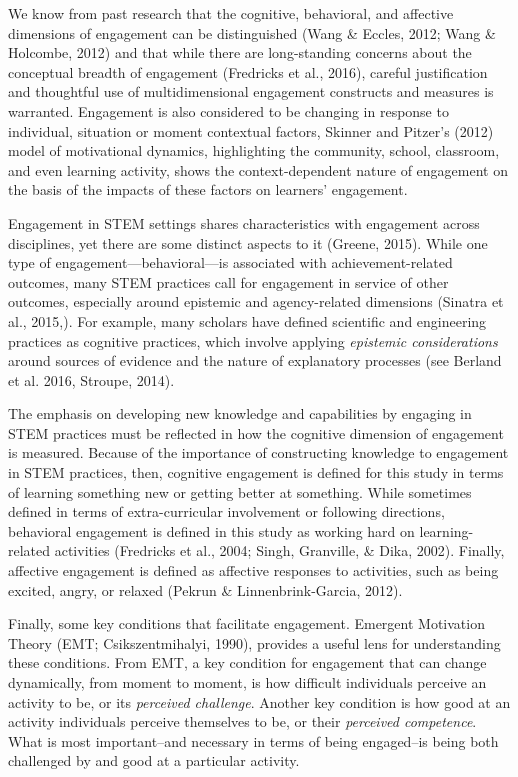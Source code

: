 \documentclass[]{msu-thesis}
\theoremstyle{definition}
\theoremstyle{definition}
\theoremstyle{definition}
\theoremstyle{remark}
\begin{document}
We know from past research that the cognitive, behavioral, and affective
dimensions of engagement can be distinguished (Wang \& Eccles, 2012;
Wang \& Holcombe, 2012) and that while there are long-standing concerns
about the conceptual breadth of engagement (Fredricks et al., 2016),
careful justification and thoughtful use of multidimensional engagement
constructs and measures is warranted. Engagement is also considered to
be changing in response to individual, situation or moment contextual
factors, Skinner and Pitzer's (2012) model of motivational dynamics,
highlighting the community, school, classroom, and even learning
activity, shows the context-dependent nature of engagement on the basis
of the impacts of these factors on learners' engagement.

Engagement in STEM settings shares characteristics with engagement
across disciplines, yet there are some distinct aspects to it (Greene,
2015). While one type of engagement---behavioral---is associated with
achievement-related outcomes, many STEM practices call for engagement in
service of other outcomes, especially around epistemic and
agency-related dimensions (Sinatra et al., 2015,). For example, many
scholars have defined scientific and engineering practices as cognitive
practices, which involve applying \emph{epistemic considerations} around
sources of evidence and the nature of explanatory processes (see Berland
et al. 2016, Stroupe, 2014).

The emphasis on developing new knowledge and capabilities by engaging in
STEM practices must be reflected in how the cognitive dimension of
engagement is measured. Because of the importance of constructing
knowledge to engagement in STEM practices, then, cognitive engagement is
defined for this study in terms of learning something new or getting
better at something. While sometimes defined in terms of
extra-curricular involvement or following directions, behavioral
engagement is defined in this study as working hard on learning-related
activities (Fredricks et al., 2004; Singh, Granville, \& Dika, 2002).
Finally, affective engagement is defined as affective responses to
activities, such as being excited, angry, or relaxed (Pekrun \&
Linnenbrink-Garcia, 2012).

Finally, some key conditions that facilitate engagement. Emergent
Motivation Theory (EMT; Csikszentmihalyi, 1990), provides a useful lens
for understanding these conditions. From EMT, a key condition for
engagement that can change dynamically, from moment to moment, is how
difficult individuals perceive an activity to be, or its \emph{perceived
challenge}. Another key condition is how good at an activity individuals
perceive themselves to be, or their \emph{perceived competence}. What is
most important--and necessary in terms of being engaged--is being both
challenged by and good at a particular activity.
\end{document}
